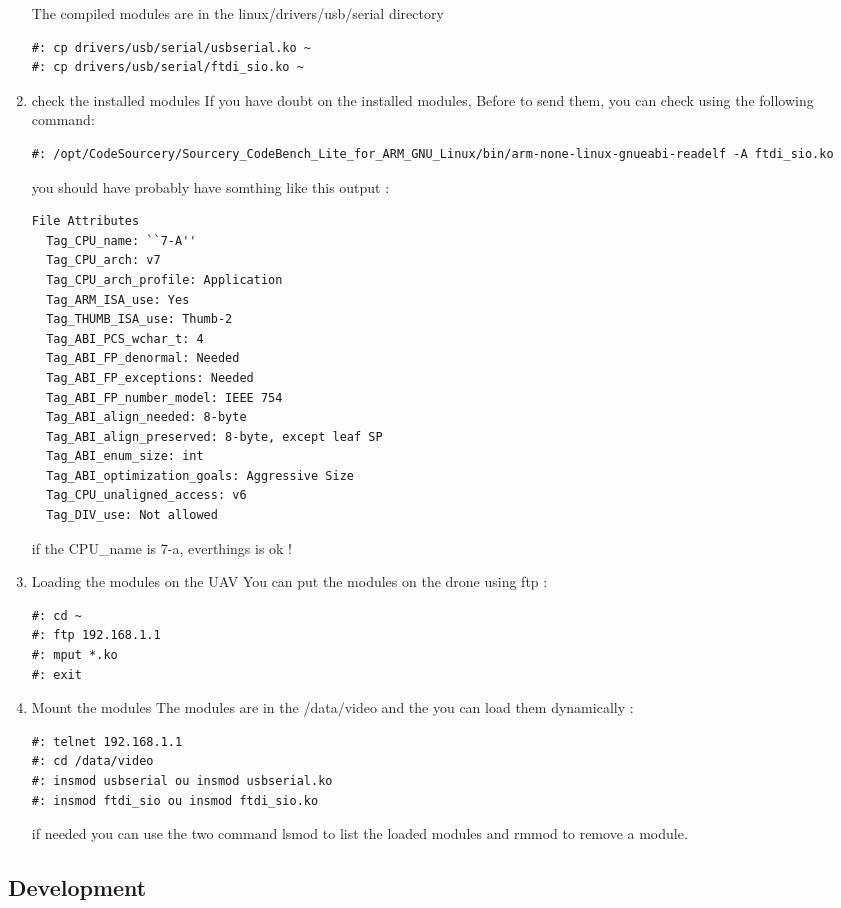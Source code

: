 \begin{enumerate}
The compiled modules are in the linux/drivers/usb/serial directory
\begin{lstlisting}
#: cp drivers/usb/serial/usbserial.ko ~
#: cp drivers/usb/serial/ftdi_sio.ko ~
\end{lstlisting}
\item check the installed modules
If you have doubt on the installed modules, Before to send them, you can check using the following command:
\begin{lstlisting}
#: /opt/CodeSourcery/Sourcery_CodeBench_Lite_for_ARM_GNU_Linux/bin/arm-none-linux-gnueabi-readelf -A ftdi_sio.ko
\end{lstlisting}
you should have probably have somthing like this output :
\begin{lstlisting}
File Attributes
  Tag_CPU_name: ``7-A''
  Tag_CPU_arch: v7
  Tag_CPU_arch_profile: Application
  Tag_ARM_ISA_use: Yes
  Tag_THUMB_ISA_use: Thumb-2
  Tag_ABI_PCS_wchar_t: 4
  Tag_ABI_FP_denormal: Needed
  Tag_ABI_FP_exceptions: Needed
  Tag_ABI_FP_number_model: IEEE 754
  Tag_ABI_align_needed: 8-byte
  Tag_ABI_align_preserved: 8-byte, except leaf SP
  Tag_ABI_enum_size: int
  Tag_ABI_optimization_goals: Aggressive Size
  Tag_CPU_unaligned_access: v6
  Tag_DIV_use: Not allowed
\end{lstlisting}
if the CPU\_name is 7-a, everthings is ok !
\item Loading the modules on the UAV
You can put the modules on the drone using ftp :
\begin{lstlisting}
#: cd ~
#: ftp 192.168.1.1
#: mput *.ko
#: exit
\end{lstlisting}
\item Mount the modules 
The modules are in the /data/video and the you can load them dynamically :
\begin{lstlisting}
#: telnet 192.168.1.1
#: cd /data/video
#: insmod usbserial ou insmod usbserial.ko
#: insmod ftdi_sio ou insmod ftdi_sio.ko
\end{lstlisting}
if needed you can use the two command lsmod to list the loaded modules and rmmod to remove a module.
\end{enumerate}

\subsection{Development}
